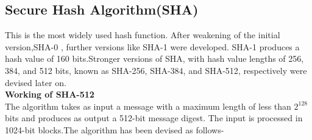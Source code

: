 \documentclass{article}
\begin{document}
\subsection{Secure Hash Algorithm(SHA)}
This is the most widely used hash function. After weakening of the initial version,SHA-0 , further versions like SHA-1 were developed.
SHA-1 produces a hash value of 160 bits.Stronger versions of SHA, with hash value lengths of 256, 384, and 512 bits, known as SHA-256, SHA-384, and SHA-512, respectively were devised later on.\\
\textbf{Working of SHA-512}\\
The algorithm takes as input a message with a maximum length of less than $2^128$ bits and produces as output a 512-bit message digest. The input is processed in 1024-bit blocks.The algorithm has been devised as follows-\\
\end{document}

